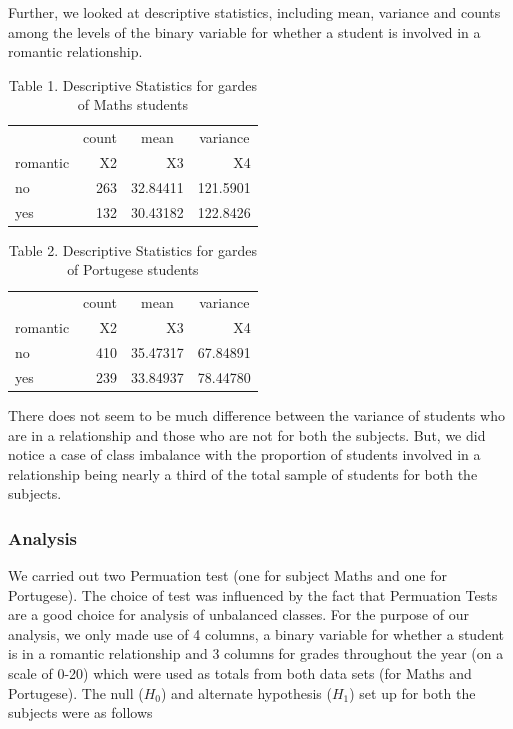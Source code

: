 \documentclass[]{article}
\begin{document}
Further, we looked at descriptive statistics, including mean, variance
and counts among the levels of the binary variable for whether a student
is involved in a romantic relationship.

\begin{table}

\caption{\label{tab:math_descriptive_stats}Table 1. Descriptive Statistics for gardes of Maths students}
\centering
\begin{tabular}[t]{l|r|r|r}
\hline
\multicolumn{1}{c|}{ } & \multicolumn{1}{c|}{count} & \multicolumn{1}{c|}{mean} & \multicolumn{1}{c}{variance} \\
\cline{2-2} \cline{3-3} \cline{4-4}
romantic & X2 & X3 & X4\\
\hline
no & 263 & 32.84411 & 121.5901\\
\hline
yes & 132 & 30.43182 & 122.8426\\
\hline
\end{tabular}
\end{table}

\begin{table}

\caption{\label{tab:unnamed-chunk-1}Table 2. Descriptive Statistics for gardes of Portugese students}
\centering
\begin{tabular}[t]{l|r|r|r}
\hline
\multicolumn{1}{c|}{ } & \multicolumn{1}{c|}{count} & \multicolumn{1}{c|}{mean} & \multicolumn{1}{c}{variance} \\
\cline{2-2} \cline{3-3} \cline{4-4}
romantic & X2 & X3 & X4\\
\hline
no & 410 & 35.47317 & 67.84891\\
\hline
yes & 239 & 33.84937 & 78.44780\\
\hline
\end{tabular}
\end{table}

There does not seem to be much difference between the variance of
students who are in a relationship and those who are not for both the
subjects. But, we did notice a case of class imbalance with the
proportion of students involved in a relationship being nearly a third
of the total sample of students for both the subjects.

\hypertarget{analysis}{%
\subsubsection{Analysis}\label{analysis}}

We carried out two Permuation test (one for subject Maths and one for
Portugese). The choice of test was influenced by the fact that
Permuation Tests are a good choice for analysis of unbalanced classes.
For the purpose of our analysis, we only made use of 4 columns, a binary
variable for whether a student is in a romantic relationship and 3
columns for grades throughout the year (on a scale of 0-20) which were
used as totals from both data sets (for Maths and Portugese). The null
(\(H_0\)) and alternate hypothesis (\(H_1\)) set up for both the
subjects were as follows
\end{document}
